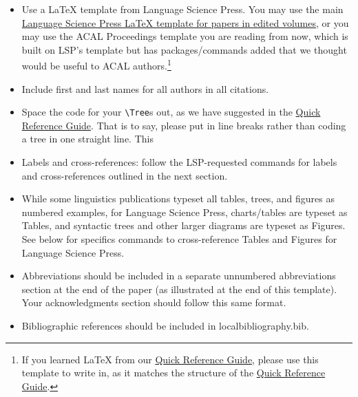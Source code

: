 \documentclass[output=paper,colorlinks,citecolor=brown,
]{langscibook}
\begin{document}
\begin{itemize}

\item Use a LaTeX template from Language Science Press. You may use the main \href{https://www.overleaf.com/latex/templates/langsci-template-for-papers-in-edited-volumes-2020-slash-05/cpjcmcphbvph}{Language Science Press LaTeX template for papers in edited volumes}, or you may use the ACAL Proceedings template you are reading from now, which is built on LSP’s template but has packages/commands added that we thought would be useful to ACAL authors.\footnote{If you learned LaTeX from our \href{https://www.overleaf.com/latex/templates/acal-proceedings-latex-quick-reference-guide/fncrcrtgnxhv}{Quick Reference Guide}, please use this template to write in, as it matches the structure of the \href{https://www.overleaf.com/latex/templates/acal-proceedings-latex-quick-reference-guide/fncrcrtgnxhv}{Quick Reference Guide}.}

\item Include first and last names for all authors in all citations. 

\item Space the code for your \verb|\Tree|s out, as we have suggested in the \href{https://www.overleaf.com/latex/templates/acal-proceedings-latex-quick-reference-guide/fncrcrtgnxhv}{Quick Reference Guide}. That is to say, please put in line breaks rather than coding a tree in one straight line. This 

\item Labels and cross-references: follow the LSP-requested commands for labels and cross-references outlined in the next section. 

\item While some linguistics publications typeset all tables, trees, and figures as numbered examples, for Language Science Press, charts/tables are typeset as Tables, and syntactic trees and other larger diagrams are typeset as Figures. See below for specifics commands to cross-reference Tables and Figures for Language Science Press. 

\item Abbreviations should be included in a separate unnumbered abbreviations section at the end of the paper (as illustrated at the end of this template). Your acknowledgments section should follow this same format.

\item Bibliographic references should be included in localbibliography.bib.

\end{itemize}
\end{document}
